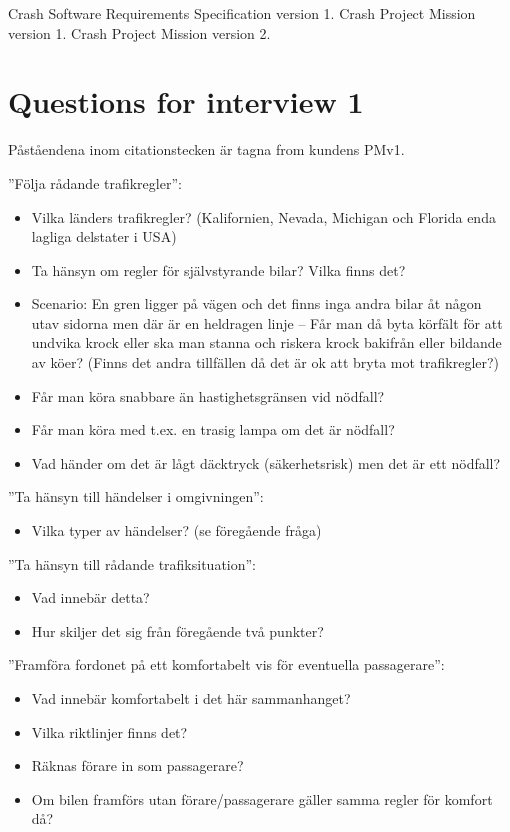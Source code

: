 \documentclass[10pt]{article}
\begin{document}
\newpage
\begin{thebibliography}{1}
 Crash Software Requirements Specification version 1. 
 Crash Project Mission version 1.
 Crash Project Mission version 2.
\end{thebibliography}
\newpage

\appendix
\section{Questions for interview 1}
Påståendena inom citationstecken är tagna from kundens PMv1.

\noindent”Följa rådande trafikregler”:
\begin{itemize}
\item Vilka länders trafikregler? (Kalifornien, Nevada, Michigan och Florida enda lagliga delstater i USA)
\item Ta hänsyn om regler för självstyrande bilar? Vilka finns det?
\item Scenario: En gren ligger på vägen och det finns inga andra bilar åt någon utav sidorna men där är en heldragen linje – Får man då byta körfält för att undvika krock eller ska man stanna och riskera krock bakifrån eller bildande av köer? (Finns det andra tillfällen då det är ok att bryta mot trafikregler?)
\item Får man köra snabbare än hastighetsgränsen vid nödfall?
\item Får man köra med t.ex. en trasig lampa om det är nödfall?
\item Vad händer om det är lågt däcktryck (säkerhetsrisk) men det är ett nödfall?
\end{itemize}
\hfill \break

\noindent ”Ta hänsyn till händelser i omgivningen”:
\begin{itemize}
\item Vilka typer av händelser? (se föregående fråga)
\end{itemize}
\hfill \break

\noindent ”Ta hänsyn till rådande trafiksituation”:
\begin{itemize}
\item Vad innebär detta?
\item Hur skiljer det sig från föregående två punkter?
\end{itemize}
\hfill \break

\noindent ”Framföra fordonet på ett komfortabelt vis för eventuella passagerare”:
\begin{itemize}
\item Vad innebär komfortabelt i det här sammanhanget? 
\item Vilka riktlinjer finns det?
\item Räknas förare in som passagerare?
\item Om bilen framförs utan förare/passagerare gäller samma regler för komfort då?
\end{itemize}
\hfill \break
\end{document}
